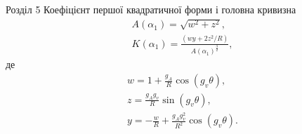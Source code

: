 \documentclass[8pt]{beamer}
\numberwithin{figure}{section}
\numberwithin{equation}{section}
\numberwithin{table}{section}
\begin{document}
\begin{frame}{Розділ 5}
Коефіцієнт першої квадратичної форми і головна кривизна
\begin{gather}
A\left(\alpha_1\right) = \sqrt{w^2+z^2},\\
K\left(\alpha_1\right) = \frac{\left(wy+2z^2/R\right)}{A\left(\alpha_1\right)^{\frac{3}{2}}},
\end{gather}
де
\begin{gather*}
w=1+\frac{g_A}{R}\cos\left(g_v\theta\right),\\
z=\frac{g_A g_v}{R}\sin\left(g_v\theta\right),\\
y=-\frac{w}{R}+\frac{g_A g_v^2}{R^2}\cos\left(g_v\theta\right).
\end{gather*}

\end{frame}
\end{document}
